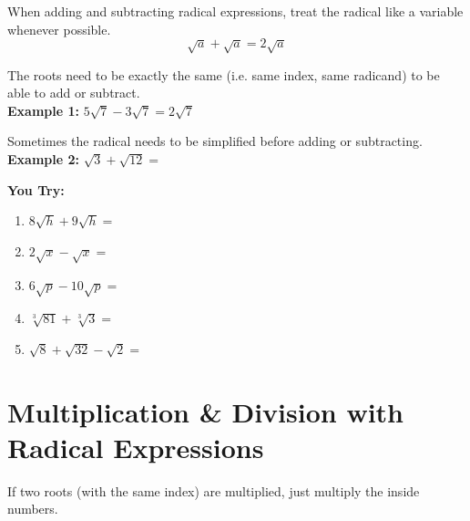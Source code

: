 \documentclass[12pt]{article}
\begin{document}
When adding and subtracting radical expressions, treat the radical like a variable whenever possible.\\

$$\sqrt{a} + \sqrt{a} = 2\sqrt{a}$$

The roots need to be exactly the same (i.e. same index, same radicand) to be able to add or subtract.\\

\textbf{Example 1:} $5\sqrt{7} - 3 \sqrt{7} = 2\sqrt{7}$\\

\vspace{1cm}

Sometimes the radical needs to be simplified before adding or subtracting.\\

\textbf{Example 2:} $\sqrt{3} + \sqrt{12}=$\\

\vspace{1cm}

\hrulefill

\textbf{You Try:}\\

\begin{enumerate}
\setlength\itemsep{1cm}

	\item $8\sqrt{h}+ 9\sqrt{h}=$\\
	
	\item $2\sqrt{x} - \sqrt{x}=$\\
	
	\item $6\sqrt{p} - 10 \sqrt{p}=$\\
	
	\item $\sqrt[3]{81} + \sqrt[3]{3}=$\\
	
	\item $\sqrt{8} + \sqrt{32} - \sqrt{2}=$\\
	
\end{enumerate}

\section{Multiplication \& Division with Radical Expressions}

If two roots (with the same index) are multiplied, just multiply the inside numbers. 
\end{document}
